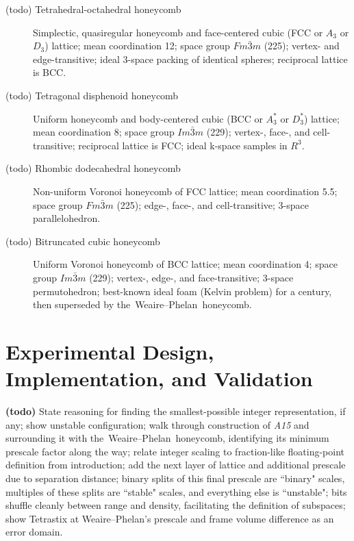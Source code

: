 \documentclass[10pt]{article}
\def\AAAB{\textit{A15}}
\def\TS{Tetrastix} \def\TSP{Tetrastix~Prism} \def\TTSp{The~Tetrastix~prism} \def\tTSp{the~Tetrastix~prism}
\def\WP{Weaire--Phelan} \def\WPH{Weaire--Phelan~Honeycomb} \def\TWPh{The~Weaire--Phelan~honeycomb}
\def\tWPh{the~Weaire--Phelan~honeycomb}
\begin{document}
\begin{description}

  \item[(todo) Tetrahedral-octahedral honeycomb] Simplectic, quasiregular honeycomb and face-centered cubic (FCC or $A_3$ or
    $D_3$) lattice; mean coordination 12; space group $Fm\bar{3}m$ (225); vertex- and edge-transitive; ideal 3-space packing of
    identical spheres; reciprocal lattice is BCC.

  \item[(todo) Tetragonal disphenoid honeycomb] Uniform honeycomb and body-centered cubic (BCC or $A_3^*$ or $D_3^*$) lattice;
    mean coordination 8; space group $Im\bar{3}m$ (229); vertex-, face-, and cell-transitive; reciprocal lattice is FCC; ideal
    k-space samples in $R^3$.

  \item[(todo) Rhombic dodecahedral honeycomb] Non-uniform Voronoi honeycomb of FCC lattice; mean coordination 5.5; space group
    $Fm\bar{3}m$ (225); edge-, face-, and cell-transitive; 3-space parallelohedron.

  \item[(todo) Bitruncated cubic honeycomb] Uniform Voronoi honeycomb of BCC lattice; mean coordination 4; space group
    $Im\bar{3}m$ (229); vertex-, edge-, and face-transitive; 3-space permutohedron; best-known ideal foam (Kelvin problem) for a
    century, then superseded by \tWPh{}.

\end{description}


\section{Experimental Design, Implementation, and Validation}\label{experimental-design-implementation-and-validation}

\textbf{(todo)} State reasoning for finding the smallest-possible integer representation, if any; show unstable configuration;
walk through construction of \AAAB{} and surrounding it with \tWPh, identifying its minimum prescale factor along the way; relate
integer scaling to fraction-like floating-point definition from introduction; add the next layer of lattice and additional
prescale due to separation distance; binary splits of this final prescale are ``binary" scales, multiples of these splits are
``stable" scales, and everything else is ``unstable"; bits shuffle cleanly between range and density, facilitating the definition
of subspaces; show \TS{} at \WP's prescale and frame volume difference as an error domain.
\end{document}
